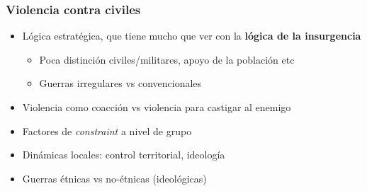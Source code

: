 \begin{frame}
\frametitle{Violencia contra civiles}
\centering

\begin{itemize}
    \item Lógica estratégica, que tiene mucho que ver con la \textbf{lógica de la insurgencia}
    \begin{itemize}
        \item Poca distinción civiles/militares, apoyo de la población etc
        \item Guerras irregulares vs convencionales
    \end{itemize}
    \item<2-> Violencia como coacción vs violencia para castigar al enemigo
    \item<3-> Factores de \textit{constraint} a nivel de grupo
    \item<4-> Dinámicas locales: control territorial, ideología
    \item<5-> Guerras étnicas vs no-étnicas (ideológicas)
\end{itemize}

\end{frame}
\note{}
  


